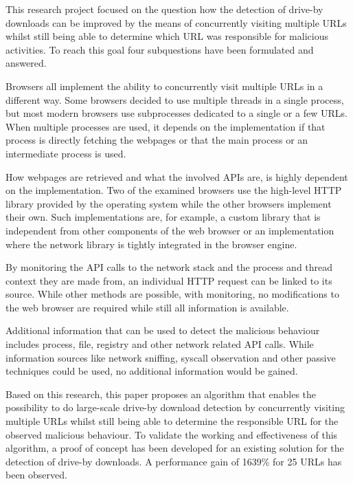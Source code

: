 This research project focused on the question how the detection of drive-by downloads can be improved by the means of concurrently visiting multiple URLs whilst still being able to determine which URL was responsible for malicious activities. To reach this goal four subquestions have been formulated and answered.

Browsers all implement the ability to concurrently visit multiple URLs in a different way. Some browsers decided to use multiple threads in a single process, but most modern browsers use subprocesses dedicated to a single or a few URLs. When multiple processes are used, it depends on the implementation if that process is directly fetching the webpages or that the main process or an intermediate process is used.

How webpages are retrieved and what the involved APIs are, is highly dependent on the implementation. Two of the examined browsers use the high-level HTTP library provided by the operating system while the other browsers implement their own. Such implementations are, for example, a custom library that is independent from other components of the web browser or an implementation where the network library is tightly integrated in the browser engine.

By monitoring the API calls to the network stack and the process and thread context they are made from, an individual HTTP request can be linked to its source. While other methods are possible, with monitoring, no modifications to the web browser are required while still all information is available.

Additional information that can be used to detect the malicious behaviour includes process, file, registry and other network related API calls. While information sources like network sniffing, syscall observation and other passive techniques could be used, no additional information would be gained.

Based on this research, this paper proposes an algorithm that enables the possibility to do large-scale drive-by download detection by concurrently visiting multiple URLs whilst still being able to determine the responsible URL for the observed malicious behaviour. To validate the working and effectiveness of this algorithm, a proof of concept has been developed for an existing solution for the detection of drive-by downloads. A performance gain of 1639\% for 25 URLs has been observed.
